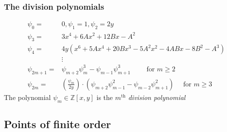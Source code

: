 \documentclass{beamer}%
\theoremstyle{definition}
\begin{document}
\begin{frame}\frametitle{The division polynomials}

\begin{Definition}[Division Polynomials of $E:y^2=x^3+Ax+B$ ($p>3$)]\vspace*{-0.7cm}
\begin{align*}
        \psi_{0} =& 0,
        \psi_{1} = 1,
        \psi_{2} = 2y\\
        \psi_{3} =& 3x^{4} + 6Ax^{2} + 12Bx - A^{2}\\
        \psi_{4} =& 4y(x^{6} + 5Ax^{4} + 20Bx^{3} - 5A^{2}x^{2} - 4ABx - 8B^{2} - A^{3}) \\
        &\vdots\\
        \psi_{2m+1} =& \psi_{m+2}\psi_{m}^{3}-\psi_{m-1}\psi^{3}_{m+1} \qquad \text{ for } m \geq 2\\
        \psi_{2m}  =& \left(\frac{\psi_{m}}{2y}\right)\cdot(\psi_{m+2}\psi^{2}_{m-1}-\psi_{m-2}\psi^{2}_{m+1}) \quad \text{ for } m \geq 3
\end{align*}
The polynomial $\psi_m\in{\mathbb Z}[x,y]$ is the $m^{\text{th}}$ \emph{division polynomial}
\end{Definition}\pause
{}
\end{frame}

\subsection{Points of finite order}
\end{document}
